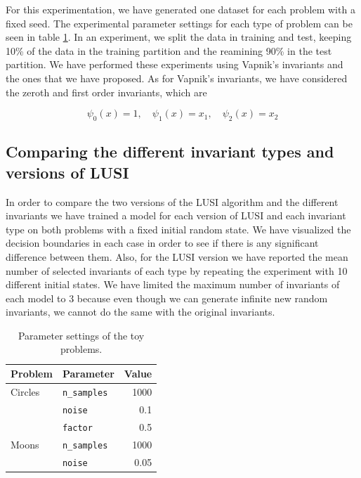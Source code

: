 For this experimentation, we have generated one dataset for each problem with a fixed seed. The experimental
parameter settings for each type of problem can be seen in table \ref{tab:toy_problems_experiments}. In an experiment,
we split the data in training and test, keeping 10\% of the data in the training partition and the reamining
90\% in the test partition. We have performed these experiments using Vapnik's invariants and the ones
that we have proposed. As for Vapnik's invariants, we have considered the zeroth and first order invariants, which are

\[
    \psi_0(x) = 1,\quad \psi_1(x) = x_1,\quad \psi_2(x) = x_2
\]

\subsection{Comparing the different invariant types and versions of LUSI}

In order to compare the two versions of the LUSI algorithm and the different invariants
we have trained a model for each version of LUSI and each invariant type on both problems with a fixed
initial random state. We have visualized the decision boundaries in each case in order to see if there is any
significant difference between them. Also, for the LUSI version we have reported the mean number of selected
invariants of each type by repeating the experiment with 10 different initial states. We have limited the
maximum number of invariants of each model to 3 because even though we can generate infinite new random
invariants, we cannot do the same with the original invariants.

\begin{table}[h]
\centering
\begin{tabular}{llr}
\textbf{Problem} & \textbf{Parameter}  & \textbf{Value} \\ \hline
Circles          & \texttt{n\_samples} & 1000           \\
                 & \texttt{noise}      & 0.1            \\
                 & \texttt{factor}     & 0.5            \\
Moons            & \texttt{n\_samples} & 1000           \\
                 & \texttt{noise}      & 0.05          
\end{tabular}
\caption{Parameter settings of the toy problems.}
\label{tab:toy_problems_experiments}
\end{table}

